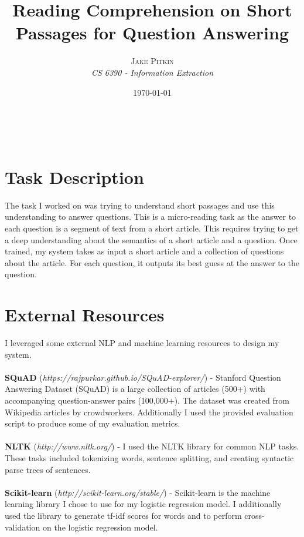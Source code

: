 \documentclass[a4paper, 11pt]{article} %
\title{\textbf{Reading Comprehension on Short Passages for Question Answering}\\ %
}%
\author{\textsc{Jake Pitkin} %
\\{\textit{CS 6390 - Information Extraction}}} %
\date{\today} %
\makeatletter
\renewcommand{\maketitle}{ %
\begin{flushright} %
{\LARGE\@title} %

\vspace{50pt} %

{\large\@author} %
\\\@date %

\vspace{40pt} %
\end{flushright}
}
\makeatother
\begin{document}
\maketitle %




 

\section*{Task Description}

The task I worked on was trying to understand short passages and use this understanding to answer questions. This is a micro-reading task as the answer to each question is a segment of text from a short article. This requires trying to get a deep understanding about the semantics of a short article and a question. Once trained, my system takes as input a short article and a collection of questions about the article. For each question, it outputs its best guess at the answer to the question.

\section*{External Resources}

I leveraged some external NLP and machine learning resources to design my system. 
\\~\\
\textbf{SQuAD} (\textit{https://rajpurkar.github.io/SQuAD-explorer/}) - Stanford Question Answering Dataset (SQuAD) is a large collection of articles (500+) with accompanying question-answer pairs (100,000+). The dataset was created from Wikipedia articles by crowdworkers. Additionally I used the provided evaluation script to produce some of my evaluation metrics.
\\~\\
\textbf{NLTK} (\textit{http://www.nltk.org/}) - I used the NLTK library for common NLP tasks. These tasks included tokenizing words, sentence splitting, and creating syntactic parse trees of sentences.
\\~\\
\textbf{Scikit-learn} (\textit{http://scikit-learn.org/stable/}) - Scikit-learn is the machine learning library I chose to use for my logistic regression model. I additionally used the library to generate tf-idf scores for words and to perform cross-validation on the logistic regression model.  
\end{document}
